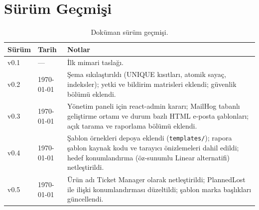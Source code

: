 \documentclass[11pt,a4paper]{article}
\begin{document}
\section{Sürüm Geçmişi}

\begin{table}[H]
\centering
\small
\begin{tabularx}{\textwidth}{p{1.6cm}p{3.2cm}X}
\toprule
\textbf{Sürüm} & \textbf{Tarih} & \textbf{Notlar}\\
\midrule
v0.1 & ---     & İlk mimari taslağı.\\
v0.2 & \today  & Şema sıkılaştırıldı (UNIQUE kısıtları, atomik sayaç, indeksler); yetki ve bildirim matrisleri eklendi; güvenlik bölümü eklendi.\\
\addlinespace
v0.3 & \today  & Yönetim paneli için react-admin kararı; MailHog tabanlı geliştirme ortamı ve durum bazlı HTML e-posta şablonları; açık tarama ve raporlama bölümü eklendi.\\
\addlinespace
v0.4 & \today  & Şablon örnekleri depoya eklendi (\texttt{templates/}); rapora şablon kaynak kodu ve tarayıcı önizlemeleri dahil edildi; hedef konumlandırma (öz-sunumlu Linear alternatifi) netleştirildi.\\
\addlinespace
v0.5 & \today  & Ürün adı Ticket Manager olarak netleştirildi; PlannedLost ile ilişki konumlandırması düzeltildi; şablon marka başlıkları güncellendi.\\
\bottomrule
\end{tabularx}
\caption{Doküman sürüm geçmişi.}
\end{table}
\end{document}
